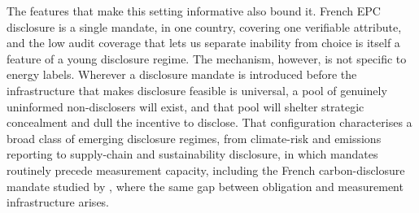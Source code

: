 The features that make this setting informative also bound it. French EPC disclosure is a
single mandate, in one country, covering one verifiable attribute, and the low audit coverage
that lets us separate inability from choice is itself a feature of a young disclosure regime.
The mechanism, however, is not specific to energy labels. Wherever a disclosure mandate is
introduced before the infrastructure that makes disclosure feasible is universal, a pool of
genuinely uninformed non-disclosers will exist, and that pool will shelter strategic
concealment and dull the incentive to disclose. That configuration characterises a broad class
of emerging disclosure regimes, from climate-risk and emissions reporting to supply-chain and
sustainability disclosure, in which mandates routinely precede measurement capacity, including
the French carbon-disclosure mandate studied by \citet{bourveau_carbon_2024}, where the same
gap between obligation and measurement infrastructure arises.
